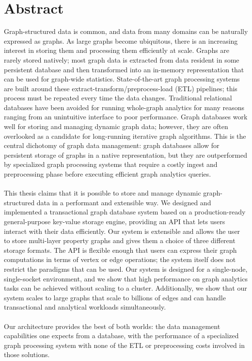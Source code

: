 \chapter{Abstract}

Graph-structured data is common, and data from many domains can be naturally expressed as graphs.
As large graphs become ubiquitous, there is an increasing interest in storing them and processing them efficiently at scale.
Graphs are rarely stored natively; most graph data is extracted from data resident in some persistent database and then transformed into an in-memory representation that can be used for graph-wide statistics. 
State-of-the-art graph processing systems are built around these extract-transform/preprocess-load (ETL) pipelines; this process must be repeated every time the data changes.
Traditional relational databases have been avoided for running whole-graph analytics for many reasons ranging from an unintuitive interface to poor performance.
Graph databases work well for storing and managing dynamic graph data; however, they are often overlooked as a candidate for long-running iterative graph algorithms.
This is the central dichotomy of graph data management: graph databases allow for persistent storage of graphs in a native representation, but they are outperformed by specialized graph processing systems that require a costly ingest and preprocessing phase before executing efficient graph analytics queries.
\\\\
This thesis claims that it is possible to store and manage dynamic graph-structured data in a performant and extensible way.
We designed and implemented a transactional graph database system based on a production-ready general-purpose key-value storage engine, providing an API that lets users interact with their data efficiently.
Our system is extensible and allows the user to store multi-layer property graphs and gives them a choice of three different storage formats.
The API is flexible enough that users can express their graph computations in terms of vertex or edge operations; the system itself does not restrict the paradigms that can be used.
Our system is designed for a single-node, single-socket environment, and we show that high performance on graph analytics tasks can be achieved without scaling to a cluster.
Additionally, we show that our system scales to large graphs that scale to billions of edges and can handle transactional and analytical workloads simultaneously.
\\\\
Our architecture provides the best of both worlds: the data management capabilities one expects from a database, with the performance of a specialized graph processing system with none of the ETL or preprocessing costs involved in those solutions.